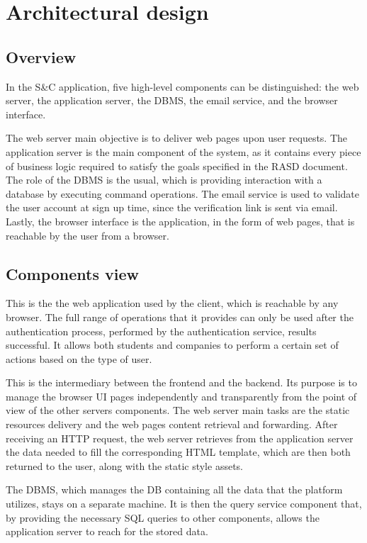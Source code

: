 \chapter{Architectural design}

\section{Overview}

In the S\&C application, five high-level components can be distinguished: the web server, the application server, the DBMS, the email service, and the browser interface.

The web server main objective is to deliver web pages upon user requests.
The application server is the main component of the system, as it contains every piece of business logic required to satisfy the goals specified in the RASD document.
The role of the DBMS is the usual, which is providing interaction with a database by executing command operations.
The email service is used to validate the user account at sign up time, since the verification link is sent via email.
Lastly, the browser interface is the application, in the form of web pages, that is reachable by the user from a browser.

\section{Components view}

This is the the web application used by the client, which is reachable by any browser.
The full range of operations that it provides can only be used after the authentication process, performed by the authentication service, results successful.
It allows both students and companies to perform a certain set of actions based on the type of user.

This is the intermediary between the frontend and the backend.
Its purpose is to manage the browser UI pages independently and transparently from the point of view of the other servers components.
The web server main tasks are the static resources delivery and the web pages content retrieval and forwarding.
After receiving an HTTP request, the web server retrieves from the application server the data needed to fill the corresponding HTML template, which are then both returned to the user, along with the static style assets.

The DBMS, which manages the DB containing all the data that the platform utilizes, stays on a separate machine.
It is then the query service component that, by providing the necessary SQL queries to other components, allows the application server to reach for the stored data.

